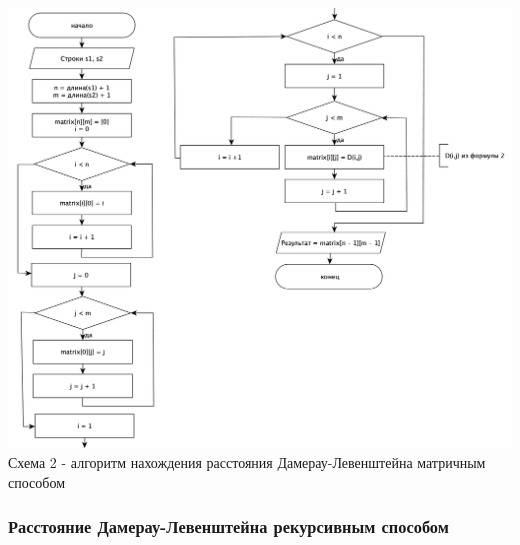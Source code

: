 \documentclass[a4paper,14pt]{article} %
\begin{document}
        \begin{center}
        		\includegraphics[scale = 0.5]{shema2} \\ Схема  2 - алгоритм нахождения расстояния Дамерау-Левенштейна матричным способом
	\end{center}
	
	\subsubsection{Расстояние Дамерау-Левенштейна рекурсивным способом}
	
\end{document}
